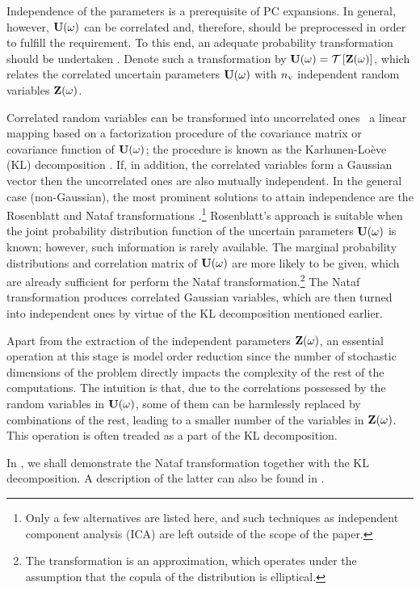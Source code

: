 Independence of the parameters is a prerequisite of PC expansions.
In general, however, $\mathbf{U}(\omega)$ can be correlated and, therefore, should be preprocessed in order to fulfill the requirement.
To this end, an adequate probability transformation should be undertaken \cite{eldred2008}.
Denote such a transformation by $\vU(\o) = \oTransform{\vZ(\o)}$, which relates the correlated uncertain parameters $\mathbf{U}(\omega)$ with ${n_\text{v}}$ independent random variables $\mathbf{Z}(\omega)$.

Correlated random variables can be transformed into uncorrelated ones \via\ a linear mapping based on a factorization procedure of the covariance matrix or covariance function of $\mathbf{U}(\omega)$; the procedure is known as the Karhunen-Lo\`{e}ve (KL) decomposition \cite{ghanem1991}.
If, in addition, the correlated variables form a Gaussian vector then the uncorrelated ones are also mutually independent.
In the general case (non-Gaussian), the most prominent solutions to attain independence are the Rosenblatt \cite{rosenblatt1952} and Nataf transformations \cite{li2008}.\footnote{Only a few alternatives are listed here, and such techniques as independent component analysis (ICA) are left outside of the scope of the paper.}
Rosenblatt's approach is suitable when the joint probability distribution function of the uncertain parameters $\mathbf{U}(\omega)$ is known; however, such information is rarely available.
The marginal probability distributions and correlation matrix of $\mathbf{U}(\omega)$ are more likely to be given, which are already sufficient for perform the Nataf transformation.\footnote{The transformation is an approximation, which operates under the assumption that the copula of the distribution is elliptical.}
The Nataf transformation produces correlated Gaussian variables, which are then turned into independent ones by virtue of the KL decomposition mentioned earlier.

Apart from the extraction of the independent parameters $\mathbf{Z}(\omega)$, an essential operation at this stage is model order reduction since the number of stochastic dimensions of the problem directly impacts the complexity of the rest of the computations.
The intuition is that, due to the correlations possessed by the random variables in $\mathbf{U}(\omega)$, some of them can be harmlessly replaced by combinations of the rest, leading to a smaller number of the variables in $\mathbf{Z}(\omega)$.
This operation is often treaded as a part of the KL decomposition.

In , we shall demonstrate the Nataf transformation together with the KL decomposition.
A description of the latter can also be found in .
